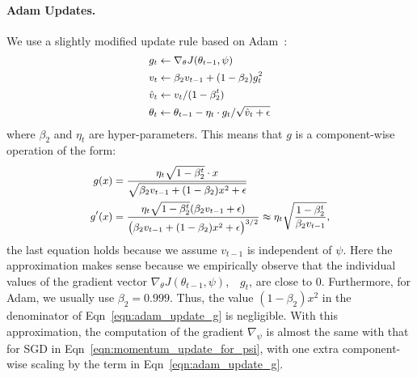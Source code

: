 \paragraph{Adam Updates.} We use a slightly modified update rule based on Adam~\citep{adam}:
\begin{equation}
  \label{eqn:adam_update}
   \small
  \begin{aligned}
    &g_t \leftarrow \nabla_\theta J(\theta_{t-1}, \psi) \\
    &v_t \leftarrow \beta_2 v_{t-1} + (1 - \beta_2) g_t^2 \\
    &\hat{v}_t \leftarrow v_t / (1 - \beta_2^t) \\
    &\theta_t \leftarrow \theta_{t-1} - \eta_t \cdot g_t / \sqrt{\hat{v}_t + \epsilon}
  \end{aligned}
\end{equation}
where $\beta_2$ and $\eta_t$ are hyper-parameters. This means that $g$ is a component-wise operation of the form:
\begin{equation}
  \label{eqn:adam_update_g}
   \small
  \begin{aligned}
    g(x) &= \frac{\eta_t \sqrt{1 - \beta_2^t} \cdot x}{\sqrt{\beta_2 v_{t-1} + (1 - \beta_2) x^2 + \epsilon}} \\
    g'(x) &= \frac{\eta_t \sqrt{1 - \beta_2^t} (\beta_2 v_{t-1} + \epsilon)}{\big( \beta_2 v_{t-1} + (1 - \beta_2) x^2 + \epsilon \big)^{3/2}} \approx \eta_t \sqrt{\frac{1 - \beta_2^t}{\beta_2 v_{t-1}}},  
  \end{aligned}
\end{equation}
the last equation holds because we assume $v_{t-1}$ is independent of $\psi$. Here the approximation makes sense because we empirically observe that the individual values of the gradient vector $\nabla_\theta J(\theta_{t-1}, \psi)$,~\ie~$g_t$, are close to $0$. Furthermore, for Adam, we usually use $\beta_2 = 0.999$. Thus, the value $(1 - \beta_2) x^2$ in the denominator of Eqn~\ref{eqn:adam_update_g} is negligible. With this approximation, the computation of the gradient $\nabla_\psi$ is almost the same with that for SGD in Eqn~\ref{eqn:momentum_update_for_psi}, with one extra component-wise scaling by the term in Eqn~\ref{eqn:adam_update_g}.

